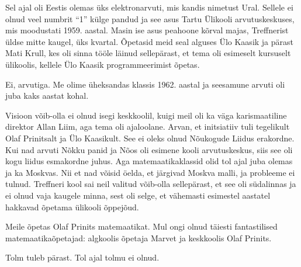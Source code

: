 Sel ajal oli Eestis olemas üks elektronarvuti, mis kandis 
nimetust Ural. Sellele ei olnud veel numbrit \enquote{1} külge 
pandud ja see asus Tartu Ülikooli arvutuskeskuses, mis moodustati 1959. aastal. Masin ise asus peahoone 
kõrval majas, Treffnerist üldse mitte kaugel, üks kvartal. 
Õpetasid meid seal alguses Ülo Kaasik ja pärast Mati 
Krull, kes oli sinna tööle läinud sellepärast, 
et tema oli esimeselt kursuselt ülikoolis, kellele Ülo Kaasik programmeerimist õpetas. 


Ei, arvutiga. Me olime üheksandas klassis 1962. aastal ja 
seesamune arvuti oli juba kaks aastat kohal. 


Visioon võib-olla ei olnud isegi keskkoolil, kuigi meil 
oli ka väga karismaatiline direktor Allan Liim, aga tema oli ajaloolane. Arvan, et initsiatiiv tuli tegelikult 
Olaf Prinitsalt ja Ülo Kaasikult. See ei oleks olnud Nõukogude Liidus erakordne. Kui nad arvuti 
Nõkku panid ja Nõos oli esimene kooli arvutuskeskus, siis 
see oli kogu liidus esmakordne juhus. Aga matemaatikaklassid olid tol ajal juba 
olemas ja ka Moskvas. Nii et nad võisid öelda, et järgivad 
Moskva malli, ja probleeme ei tulnud. Treffneri kool sai neil valitud võib-olla sellepärast, et see oli südalinnas ja 
ei olnud vaja kaugele minna, sest oli selge, et vähemasti esimestel 
aastatel hakkavad õpetama ülikooli õppejõud. 

Meile õpetas Olaf Prinits 
matemaatikat. Mul ongi olnud täiesti fantastilised 
matemaatikaõpetajad: algkoolis õpetaja Marvet ja keskkoolis Olaf 
Prinits. 


Tolm tuleb pärast. Tol ajal tolmu ei olnud. 

